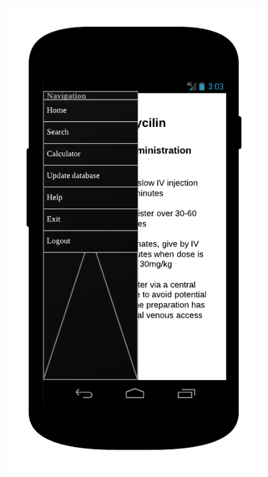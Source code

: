 \begin{description}
\begin{description}
\begin{figure}
\begin{minipage}{.5\textwidth}
  \includegraphics[width=.7\linewidth]{Images/mockups/menu.png}
\end{minipage}
\end{figure}



\end{description}
\end{description}
